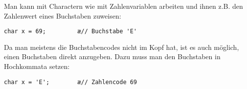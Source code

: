 Man kann mit Charactern wie mit Zahlenvariablen arbeiten und ihnen z.B. den
Zahlenwert eines Buchstaben zuweisen:

\begin{lstlisting}
char x = 69;         æ// Buchstabe 'E'
\end{lstlisting}

Da man meistens die Buchstabencodes nicht im Kopf hat, ist es auch möglich,
einen Buchstaben direkt anzugeben. Dazu muss man den Buchstaben in Hochkommata
setzen:

\begin{lstlisting}
char x = 'E';        æ// Zahlencode 69
\end{lstlisting}
